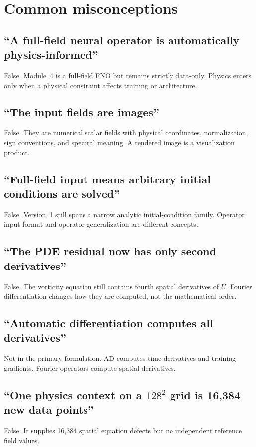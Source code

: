 \documentclass[11pt]{article}
\begin{document}
\section{Common misconceptions}
\label{sec:misconceptions}

\subsection{``A full-field neural operator is automatically physics-informed''}
False. Module~4 is a full-field FNO but remains strictly data-only. Physics enters only when a physical constraint affects training or architecture.

\subsection{``The input fields are images''}
False. They are numerical scalar fields with physical coordinates, normalization, sign conventions, and spectral meaning. A rendered image is a visualization product.

\subsection{``Full-field input means arbitrary initial conditions are solved''}
False. Version~1 still spans a narrow analytic initial-condition family. Operator input format and operator generalization are different concepts.

\subsection{``The PDE residual now has only second derivatives''}
False. The vorticity equation still contains fourth spatial derivatives of $U$. Fourier differentiation changes how they are computed, not the mathematical order.

\subsection{``Automatic differentiation computes all derivatives''}
Not in the primary formulation. AD computes time derivatives and training gradients. Fourier operators compute spatial derivatives.

\subsection{``One physics context on a $128^2$ grid is 16,384 new data points''}
False. It supplies 16,384 spatial equation defects but no independent reference field values.
\end{document}
